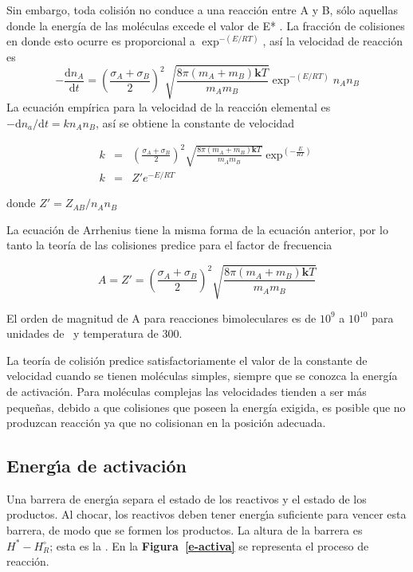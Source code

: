 Sin embargo, toda colisión no conduce a una reacción entre A y B, sólo aquellas donde la energía de las moléculas excede el valor de E* . La fracción de colisiones en donde esto ocurre es proporcional a \( \exp^{-(E/RT)} \), así  la velocidad de reacción es
\begin{equation}
 -\frac{\mathrm{d}n_A}{\mathrm{d}t}=\left(\frac{ \sigma_A+ \sigma_B }{ 2 }\right)^2 \sqrt{\frac{8 \pi(m_A+m_B)\textbf{k}T }{m_Am_B}} \exp^{-(E/RT)} n_An_B 
\end{equation}
La ecuación empírica para la velocidad de la reacción elemental es \( -\mathrm{d}n_a/\mathrm{d}t=kn_An_B \), así se obtiene la constante de velocidad

\begin{eqnarray}
 k&=&\left(\frac{ \sigma_A+ \sigma_B }{ 2 }\right)^2 \sqrt{\frac{8 \pi(m_A+m_B)\textbf{k}T }{m_Am_B}} \exp^{(-\frac{E}{RT})} \\
 k&=&Z'e^{-E/RT}
\end{eqnarray}

donde \( Z'=Z_{AB}/n_An_B \)

La ecuación de Arrhenius  tiene la misma forma de la ecuación anterior, por lo tanto la teoría de las colisiones predice para el factor de frecuencia 

\begin{equation}
A=Z'= \left(\frac{ \sigma_A+ \sigma_B }{ 2 }\right)^2 \sqrt{\frac{8 \pi(m_A+m_B)\textbf{k}T }{m_Am_B}}
\end{equation}

El orden de magnitud de A para reacciones bimoleculares es de $10^9$ a $10^{10}$ para unidades de \mole\per\liter~y temperatura de 300\kelvin.

La teoría de colisión predice satisfactoriamente el valor de la constante de velocidad cuando se tienen moléculas simples, siempre que se conozca la energía de activación. Para moléculas complejas las velocidades tienden a ser más pequeñas, debido a que  colisiones que poseen la energía exigida, es posible que no produzcan reacción ya que no colisionan en la posición adecuada.

\subsection{Energ\'{\i}a de activaci\'on}

Una barrera de energ\'{\i}a separa el estado de los reactivos y el estado de los productos. Al chocar, los reactivos deben tener energ\'{\i}a suficiente para  vencer esta barrera, de modo que se formen los productos. La altura de la barrera es $H^* - H^\circ _R$; esta es la .
  En la \textbf{Figura~\ref{e-activa}} se representa el proceso de reacci\'on. 

